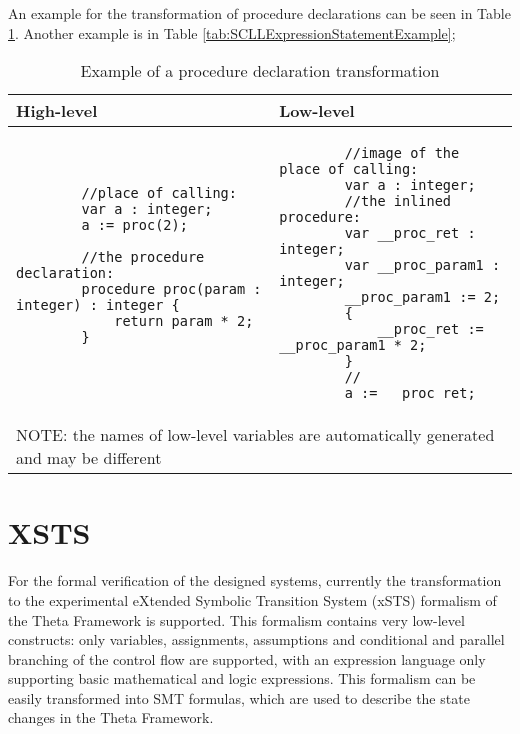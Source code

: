 An example for the transformation of procedure declarations can be seen in Table \ref{tab:SCLLProcedureDeclarationExample}. Another example is in Table \ref{tab:SCLLExpressionStatementExample};

\begin{table}[ht]
	\footnotesize
	\centering
	\begin{tabular}{ p{7cm} p{7cm} }
		\toprule
		High-level & Low-level \\
		\midrule
		\begin{lstlisting}
		//place of calling:
		var a : integer;
		a := proc(2);
		
		//the procedure declaration:
		procedure proc(param : integer) : integer {
			return param * 2;
		}
		
		\end{lstlisting} & 
		\begin{lstlisting}
		//image of the place of calling:
		var a : integer;
		//the inlined procedure:
		var __proc_ret : integer;
		var __proc_param1 : integer;
		__proc_param1 := 2;
		{
			__proc_ret := __proc_param1 * 2;
		}
		//
		a := __proc_ret;\end{lstlisting} \\
		\bottomrule
		\multicolumn{2}{l}{NOTE: the names of low-level variables are automatically generated and may be different}
	\end{tabular}
	\caption{Example of a procedure declaration transformation}
	\label{tab:SCLLProcedureDeclarationExample}
\end{table}

\bigskip
\section{XSTS} \label{section_tr_xsts}
For the formal verification of the designed systems, currently the transformation to the experimental eXtended Symbolic Transition System (xSTS) formalism of the Theta Framework \cite{ThetaToolPaper} is supported. This formalism contains very low-level constructs: only variables, assignments, assumptions and conditional and parallel branching of the control flow are supported, with an expression language only supporting basic mathematical and logic expressions. This formalism can be easily transformed into SMT formulas, which are used to describe the state changes in the Theta Framework.

